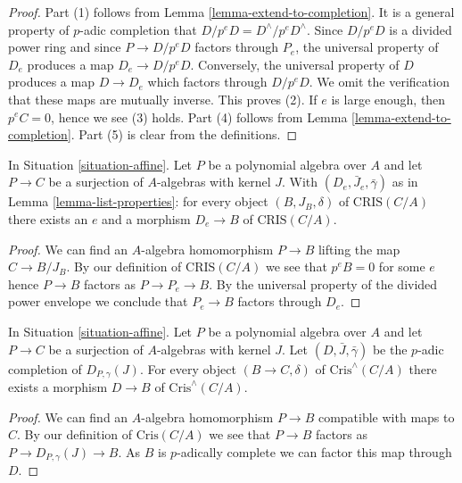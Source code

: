 \begin{proof}
Part (1) follows from Lemma \ref{lemma-extend-to-completion}.
It is a general property of $p$-adic completion that
$D/p^eD = D^\wedge/p^eD^\wedge$. Since $D/p^eD$ is a divided power ring
and since $P \to D/p^eD$ factors through $P_e$, the universal property of
$D_e$ produces a map $D_e \to D/p^eD$. Conversely, the universal property
of $D$ produces a map $D \to D_e$ which factors through $D/p^eD$. We omit
the verification that these maps are mutually inverse. This proves (2).
If $e$ is large enough, then $p^eC = 0$, hence we see (3) holds.
Part (4) follows from Lemma \ref{lemma-extend-to-completion}.
Part (5) is clear from the definitions.
\end{proof}

\begin{lemma}
\label{lemma-set-generators}
In Situation \ref{situation-affine}.
Let $P$ be a polynomial algebra over $A$ and let
$P \to C$ be a surjection of $A$-algebras with kernel $J$.
With $(D_e, \bar J_e, \bar\gamma)$ as in Lemma \ref{lemma-list-properties}:
for every object $(B, J_B, \delta)$ of $\text{CRIS}(C/A)$ there
exists an $e$ and a morphism $D_e \to B$ of $\text{CRIS}(C/A)$.
\end{lemma}

\begin{proof}
We can find an $A$-algebra homomorphism $P \to B$
lifting the map $C \to B/J_B$. By our definition of
$\text{CRIS}(C/A)$ we see that $p^eB = 0$ for
some $e$ hence $P \to B$ factors as $P \to P_e \to B$.
By the universal property of the divided power envelope we
conclude that $P_e \to B$ factors through $D_e$.
\end{proof}

\begin{lemma}
\label{lemma-generator-completion}
In Situation \ref{situation-affine}.
Let $P$ be a polynomial algebra over $A$ and let
$P \to C$ be a surjection of $A$-algebras with kernel $J$.
Let $(D, \bar J, \bar\gamma)$ be the $p$-adic completion of
$D_{P, \gamma}(J)$. For every object $(B \to C, \delta)$ of
$\text{Cris}^\wedge(C/A)$ there
exists a morphism $D \to B$ of $\text{Cris}^\wedge(C/A)$.
\end{lemma}

\begin{proof}
We can find an $A$-algebra homomorphism $P \to B$ compatible
with maps to $C$. By our definition of
$\text{Cris}(C/A)$ we see that $P \to B$ factors as
$P \to D_{P, \gamma}(J) \to B$. As $B$ is $p$-adically complete
we can factor this map through $D$.
\end{proof}



